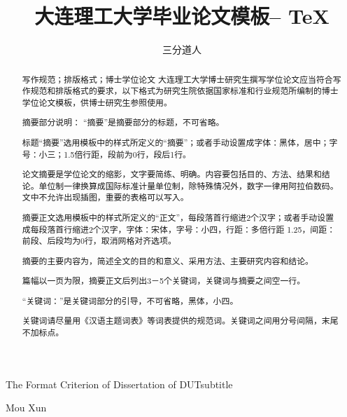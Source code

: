 \documentclass[master]{dutthesis} %
\begin{document}

\title{大连理工大学毕业论文模板-- \TeX}{}{The Format Criterion of Dissertation of 
DUT}{subtitle}
%

\author{三分道人}{Mou Xun}

\address{物理系}
\maketitle

\begin{abstract}{写作规范；排版格式；博士学位论文 }
大连理工大学博士研究生撰写学位论文应当符合写作规范和排版格式的要求，以下格式为研究生院依据国家标准和行业规范所编制的博士学位论文模板，供博士研究生参照使用。 

摘要部分说明：
“摘要”是摘要部分的标题，不可省略。

标题“摘要”选用模板中的样式所定义的“摘要”；或者手动设置成字体：黑体，居中；字号：小三；1.5倍行距，段前为0行，段后1行。

论文摘要是学位论文的缩影，文字要简练、明确。内容要包括目的、方法、结果和结论。单位制一律换算成国际标准计量单位制，除特殊情况外，数字一律用阿拉伯数码。文中不允许出现插图，重要的表格可以写入。

摘要正文选用模板中的样式所定义的“正文”，每段落首行缩进2个汉字；或者手动设置成每段落首行缩进2个汉字，字体：宋体，字号：小四，行距：多倍行距 1.25，间距：前段、后段均为0行，取消网格对齐选项。

摘要的主要内容为，简述全文的目的和意义、采用方法、主要研究内容和结论。

篇幅以一页为限，摘要正文后列出3－5个关键词，关键词与摘要之间空一行。

“关键词：”是关键词部分的引导，不可省略，黑体，小四。

关键词请尽量用《汉语主题词表》等词表提供的规范词。关键词之间用分号间隔，末尾不加标点。

\end{abstract}
\end{document}
